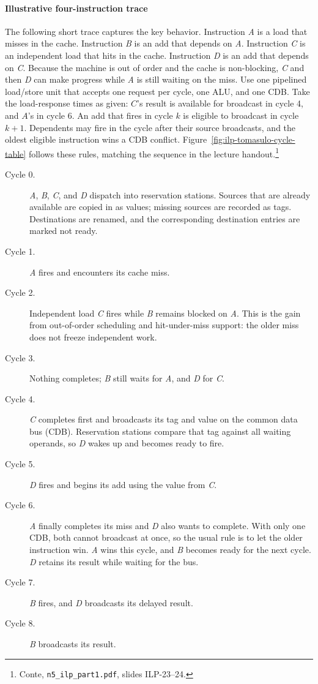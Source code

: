 \paragraph{Illustrative four-instruction trace}\label{par:ilp-tomasulo-trace}
The following short trace captures the key behavior.
Instruction \textit{A} is a load that misses in the cache.
Instruction \textit{B} is an add that depends on \textit{A}\@.
Instruction \textit{C} is an independent load that hits in the cache.
Instruction \textit{D} is an add that depends on \textit{C}\@.
Because the machine is out of order and the cache is non-blocking, \textit{C} and then \textit{D} can make progress while \textit{A} is still waiting on the miss.
Use one pipelined load/store unit that accepts one request per cycle, one ALU, and one CDB.
Take the load-response times as given: $C$'s result is available for broadcast in cycle 4, and $A$'s in cycle 6.
An add that fires in cycle $k$ is eligible to broadcast in cycle $k+1$.
Dependents may fire in the cycle after their source broadcasts, and the oldest eligible instruction wins a CDB conflict.
Figure~\ref{fig:ilp-tomasulo-cycle-table} follows these rules, matching the sequence in the lecture handout.\footnote{Conte, \texttt{n5\_ilp\_part1.pdf}, slides ILP-23--24.}

\begin{description}
    \item[Cycle 0.] \textit{A}, \textit{B}, \textit{C}, and \textit{D} dispatch into reservation stations.
    Sources that are already available are copied in as values; missing sources are recorded as tags.
    Destinations are renamed, and the corresponding destination entries are marked not ready.
    \item[Cycle 1.] \textit{A} fires and encounters its cache miss.
    \item[Cycle 2.] Independent load \textit{C} fires while \textit{B} remains blocked on \textit{A}\@.
    This is the gain from out-of-order scheduling and hit-under-miss support: the older miss does not freeze independent work.
    \item[Cycle 3.] Nothing completes; \textit{B} still waits for \textit{A}, and \textit{D} for \textit{C}\@.
    \item[Cycle 4.] \textit{C} completes first and broadcasts its tag and value on the common data bus (CDB).
    Reservation stations compare that tag against all waiting operands, so \textit{D} wakes up and becomes ready to fire.
    \item[Cycle 5.] \textit{D} fires and begins its add using the value from \textit{C}\@.
    \item[Cycle 6.] \textit{A} finally completes its miss and \textit{D} also wants to complete.
    With only one CDB, both cannot broadcast at once, so the usual rule is to let the older instruction win.
    \textit{A} wins this cycle, and \textit{B} becomes ready for the next cycle.
    \textit{D} retains its result while waiting for the bus.
    \item[Cycle 7.] \textit{B} fires, and \textit{D} broadcasts its delayed result.
    \item[Cycle 8.] \textit{B} broadcasts its result.
\end{description}
